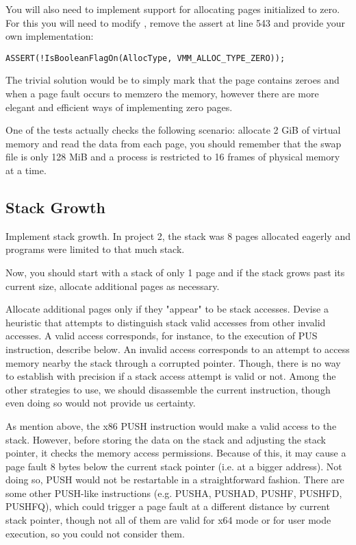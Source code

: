 You will also need to implement support for allocating pages initialized to zero. For this you will
need to modify , remove the assert at line 543 and provide your own
implementation:
\begin{verbatim}
ASSERT(!IsBooleanFlagOn(AllocType, VMM_ALLOC_TYPE_ZERO));
\end{verbatim}

The trivial solution would be to simply mark that the page contains zeroes and when a page fault
occurs to memzero the memory, however there are more elegant and efficient ways of implementing
zero pages.

One of the tests actually checks the following scenario: allocate 2 GiB of virtual memory and read
the data from each page, you should remember that the swap file is only 128 MiB and a process is
restricted to 16 frames of physical memory at a time.

\subsection{Stack Growth}

Implement stack growth. In project 2, the stack was 8 pages allocated eagerly and programs were limited to that much stack.

Now, you should start with a stack of only 1 page and if the stack grows past its current size, allocate additional pages as necessary.

Allocate additional pages only if they "appear" to be stack accesses. Devise a heuristic
that attempts to distinguish stack valid accesses from other invalid accesses. A valid access corresponds, for instance, to the execution of PUS instruction, describe below. An invalid access corresponds to an attempt to access memory nearby the stack through a corrupted pointer. Though, there is no way to establish with precision if a stack access attempt is valid or not. Among the other strategies to use, we should disassemble the current instruction, though even doing so would not provide us certainty. 

As mention above, the x86 PUSH instruction would make a valid access to the stack. However, before storing the data on the stack and adjusting the stack pointer, it checks the memory access permissions. Because of this, it may cause a page fault 8 bytes below the current stack pointer (i.e. at a bigger address). Not doing so, PUSH would not be restartable in a straightforward fashion. There are some other PUSH-like instructions (e.g. PUSHA, PUSHAD, PUSHF, PUSHFD, PUSHFQ), which could trigger a page fault at a different distance by current stack pointer, though not all of them are valid for x64 mode or for user mode execution, so you could not consider them. 

